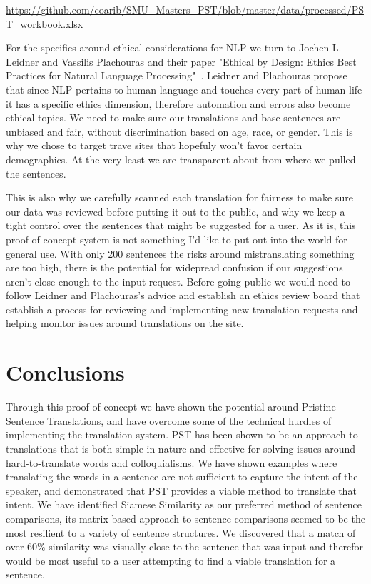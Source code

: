 \documentclass[runningheads]{llncs}
\begin{document}
\url{https://github.com/coarib/SMU_Masters_PST/blob/master/data/processed/PST_workbook.xlsx}

For the specifics around ethical considerations for NLP we turn to Jochen L. Leidner and Vassilis Plachouras and their paper "Ethical by Design: Ethics Best Practices for Natural Language Processing"~\cite{ref_url15}.  Leidner and Plachouras propose that since NLP pertains to human language and touches every part of human life it has a specific ethics dimension, therefore automation and errors also become ethical topics. We need to make sure our translations and base sentences are unbiased and fair, without discrimination based on age, race, or gender. This is why we chose to target trave sites that hopefuly won't favor certain demographics. At the very least we are transparent about from where we pulled the sentences.

This is also why we carefully scanned each translation for fairness to make sure our data was reviewed before putting it out to the public, and why we keep a tight control over the sentences that might be suggested for a user. As it is, this proof-of-concept system is not something I'd like to put out into the world for general use. With only 200 sentences the risks around mistranslating something are too high, there is the potential for widepread confusion if our suggestions aren't close enough to the input request. Before going public we would need to follow Leidner and Plachouras's advice and establish an ethics review board that establish a process for reviewing and implementing new translation requests and helping monitor issues around translations on the site.

	
	\section{Conclusions}
	Through this proof-of-concept we have shown the potential around Pristine Sentence Translations, and have overcome some of the technical hurdles of implementing the translation system. PST has been shown to be an approach to translations that is both simple in nature and effective for solving issues around hard-to-translate words and colloquialisms. We have shown examples where translating the words in a sentence are not sufficient to capture the intent of the speaker, and demonstrated that PST provides a viable method to translate that intent. 
	We have identified Siamese Similarity as our preferred method of sentence comparisons, its matrix-based approach to sentence comparisons seemed to be the most resilient to a variety of sentence structures. We discovered that a match of over 60\% similarity was visually close to the sentence that was input and therefor would be most useful to a user attempting to find a viable translation for a sentence.
\end{document}
